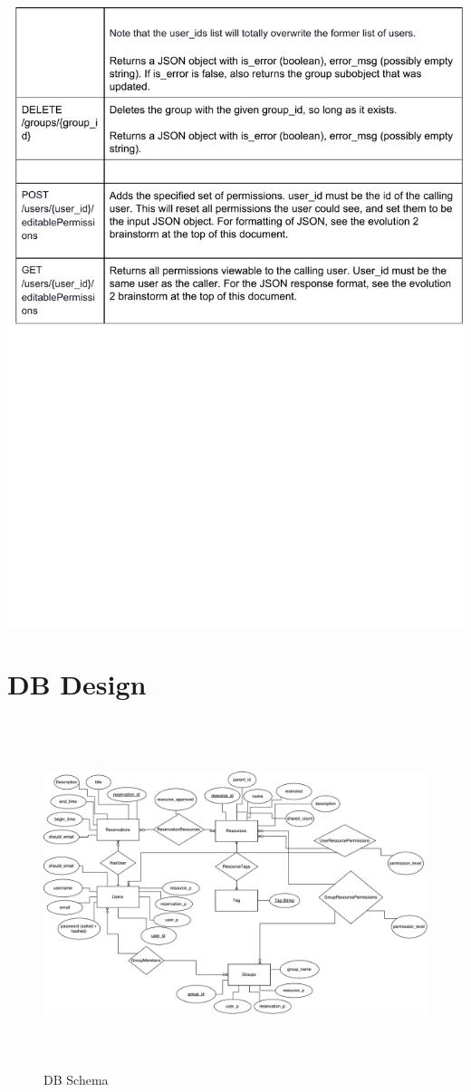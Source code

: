 \documentclass[12pt]{article}
\begin{document}
\includegraphics[width=6in]{../ev3/apispec_06.pdf}

\clearpage
\section{DB Design}
\label{appendix:DBDesign}
\begin{figure}[h]
\begin{center}
\includegraphics[height=4in]{Evolution4DB.pdf}
\end{center}
\caption{DB Schema}
\end{figure}
\end{document}
